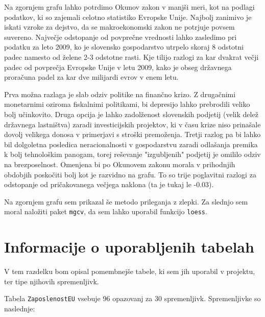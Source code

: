 \documentclass[11pt,a4paper]{article}
\begin{document}
Na zgornjem grafu lahko potrdimo Okunov zakon v manjši meri, kot na podlagi podatkov, ki so zajemali celotno statistiko Evropske Unije. Najbolj zanimivo je iskati vzroke za dejstvo, da se makroekonomski zakon ne potrjuje povsem suvereno. Največje odstopanje od povprečne vrednosti lahko zasledimo pri podatku za leto 2009, ko je slovensko gospodarstvo utrpelo skoraj 8 odstotni padec namesto od želene 2-3 odstotne rasti. Kje tilijo razlogi za kar dvakrat večji padec od povprečja Evropske Unije v letu 2009, kako je obseg državnega proračuna padel za kar dve milijardi evrov v enem letu.

Prva možna razlaga je slab odziv politike na finančno krizo. Z drugačnimi monetarnimi oziroma fiskalnimi politikami, bi depresijo lahko prebrodili veliko bolj učinkovito. Druga opcija je lahko zadolženost slovenskih podjetij (velik delež državnega lastništva) zaradi investicijskih projektov, ki v času krize niso prinašale dovolj velikega donosa v primerjavi s stroški premoženja. Tretji razlog pa bi lahko bil dolgoletna posledica neracionalnosti v gospodarstvu zaradi odlašanja premika k bolj tehnološkim panogam, torej reševanje "izgubljenih" podjetij je omililo odziv na brezposelnost. Omenjena bi po Okunovem zakonu morala v prihodnjih obdobjih poskočiti bolj kot je razvidno na grafu. To so trije poglavitni razlogi za odstopanje od pričakovanega večjega naklona (ta je tukaj le -0.03).


Na zgornjem grafu sem prikazal še metodo prileganja z zlepki. Za slednjo sem moral naložiti paket \verb|mgcv|, da sem lahko uporabil funkcijo \verb|loess|.


\pagebreak
\section{Informacije o uporabljenih tabelah}

V tem razdelku bom opisal pomembnejše tabele, ki sem jih uporabil v projektu, ter tipe njihovih spremenljivk.

Tabela \verb|ZaposlenostEU| vsebuje 96 opazovanj za 30 spremenljivk. Spremenljivke so naslednje:
\end{document}
